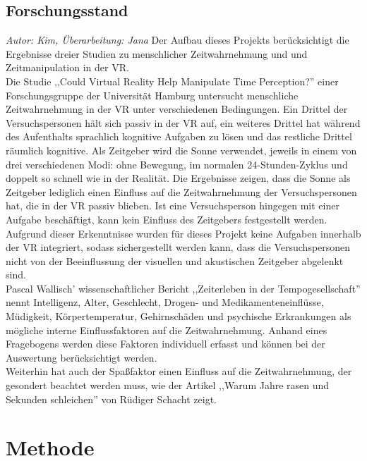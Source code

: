 \documentclass{Paper}
\begin{document}
\subsection{Forschungsstand}
\textit{Autor: Kim, Überarbeitung: Jana}
Der Aufbau dieses Projekts berücksichtigt die Ergebnisse dreier Studien zu menschlicher Zeitwahrnehmung und und Zeitmanipulation in der VR.\\
Die Studie ,,Could Virtual Reality Help Manipulate Time Perception?'' einer Forschungsgruppe der Universität Hamburg untersucht menschliche Zeitwahrnehmung in der VR unter verschiedenen Bedingungen. Ein Drittel der Versuchspersonen hält sich passiv in der VR auf, ein weiteres Drittel hat während des Aufenthalts sprachlich kognitive Aufgaben zu lösen und das restliche Drittel räumlich kognitive. 
Als Zeitgeber wird die Sonne verwendet, jeweils in einem von drei verschiedenen Modi: ohne Bewegung, im normalen 24-Stunden-Zyklus und doppelt so schnell wie in der Realität. Die Ergebnisse zeigen, dass die Sonne als Zeitgeber lediglich einen Einfluss auf die Zeitwahrnehmung der Versuchspersonen hat, die in der VR passiv blieben. Ist eine Versuchsperson hingegen mit einer Aufgabe beschäftigt, kann kein Einfluss des Zeitgebers festgestellt werden.\cite{DeviceSystems2016}\\
Aufgrund dieser Erkenntnisse wurden für dieses Projekt keine Aufgaben innerhalb der VR integriert, sodass sichergestellt werden kann, dass die Versuchspersonen nicht von der Beeinflussung der visuellen und akustischen Zeitgeber abgelenkt sind.\\
Pascal Wallisch' wissenschaftlicher Bericht ,,Zeiterleben in der Tempogesellschaft'' nennt Intelligenz, Alter, Geschlecht, Drogen- und Medikamenteneinflüsse, Müdigkeit, Körpertemperatur, Gehirnschäden und psychische Erkrankungen als mögliche interne Einflussfaktoren auf die Zeitwahrnehmung.\cite{Wallisch2003} 
Anhand eines Fragebogens werden diese Faktoren individuell erfasst und können bei der Auswertung berücksichtigt werden.\\
Weiterhin hat auch der Spaßfaktor einen Einfluss auf die Zeitwahrnehmung, der gesondert beachtet werden muss, wie der Artikel ,,Warum Jahre rasen und Sekunden schleichen'' von Rüdiger Schacht zeigt. \cite{Welt24}

\section{Methode}
\end{document}
